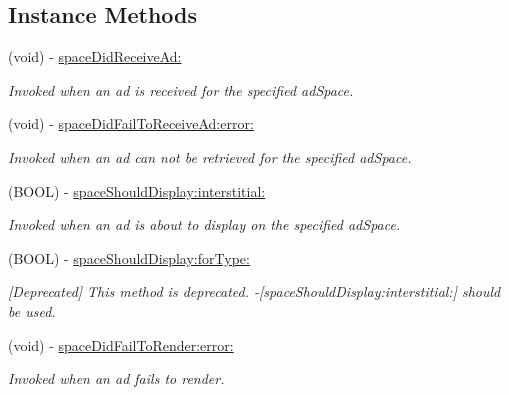 \subsection*{Instance Methods}
\begin{DoxyCompactItemize}
\item 
(void) -\/ \hyperlink{protocolFlurryAdDelegate_01-p_a92196ccfbcf5263cfc54554c676a39ae}{space\+Did\+Receive\+Ad\+:}
\begin{DoxyCompactList}\small\item\em Invoked when an ad is received for the specified {\ttfamily ad\+Space}. \end{DoxyCompactList}\item 
(void) -\/ \hyperlink{protocolFlurryAdDelegate_01-p_af97ae68142b2dde8c4428cffacfa00b4}{space\+Did\+Fail\+To\+Receive\+Ad\+:error\+:}
\begin{DoxyCompactList}\small\item\em Invoked when an ad can not be retrieved for the specified {\ttfamily ad\+Space}. \end{DoxyCompactList}\item 
(B\+O\+OL) -\/ \hyperlink{protocolFlurryAdDelegate_01-p_a6d902e66617c05092d538de0fe9dbb07}{space\+Should\+Display\+:interstitial\+:}
\begin{DoxyCompactList}\small\item\em Invoked when an ad is about to display on the specified {\ttfamily ad\+Space}. \end{DoxyCompactList}\item 
\mbox{\label{protocolFlurryAdDelegate_01-p_a0d4c164db8eac8d25f61807ac4264578}} 
(B\+O\+OL) -\/ \hyperlink{protocolFlurryAdDelegate_01-p_a0d4c164db8eac8d25f61807ac4264578}{space\+Should\+Display\+:for\+Type\+:}
\begin{DoxyCompactList}\small\item\em \mbox{[}Deprecated\mbox{]} This method is deprecated. -\/\mbox{[}space\+Should\+Display\+:interstitial\+:\mbox{]} should be used. \end{DoxyCompactList}\item 
(void) -\/ \hyperlink{protocolFlurryAdDelegate_01-p_af988369f8b2606cebfca16672aabb280}{space\+Did\+Fail\+To\+Render\+:error\+:}
\begin{DoxyCompactList}\small\item\em Invoked when an ad fails to render. \end{DoxyCompactList}\item 

\end{DoxyCompactItemize}
